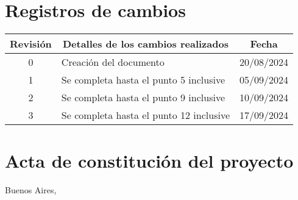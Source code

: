 \documentclass[
11pt, %
]{charter}
\begin{document}
\maketitle
\thispagestyle{empty}
\pagebreak


\thispagestyle{empty}
{\setlength{\parskip}{0pt}
\tableofcontents{}
}
\pagebreak


\section*{Registros de cambios}
\label{sec:registro}


\begin{table}[ht]
\label{tab:registro}
\centering
\begin{tabularx}{\linewidth}{@{}|c|X|c|@{}}
\hline
\rowcolor[HTML]{C0C0C0} 
Revisión & \multicolumn{1}{c|}{\cellcolor[HTML]{C0C0C0}Detalles de los cambios realizados} & Fecha      \\ \hline
0      & Creación del documento                                & {20}/{08}/2024 \\ \hline
1      & Se completa hasta el punto 5 inclusive                & {05}/{09}/2024 \\ \hline
2      & Se completa hasta el punto 9 inclusive                & {10}/{09}/2024 \\ \hline
3      & Se completa hasta el punto 12 inclusive               & {17}/{09}/{2024} \\ \hline


\end{tabularx}
\end{table}

\pagebreak



\section*{Acta de constitución del proyecto}
\label{sec:acta}

\begin{flushright}
Buenos Aires, \fechaInicioName
\end{flushright}
\end{document}
